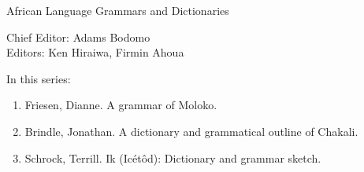 {\large African Language Grammars and Dictionaries}

\bigskip

Chief Editor:    Adams Bodomo \\
Editors:    Ken Hiraiwa,    Firmin Ahoua 

\bigskip

In this series:

\begin{enumerate}
\item Friesen, Dianne. A grammar of Moloko.
\item Brindle, Jonathan. A dictionary and grammatical outline of Chakali.
\item Schrock, Terrill. Ik (Icétôd): Dictionary and grammar sketch.
\end{enumerate}


\vfill

